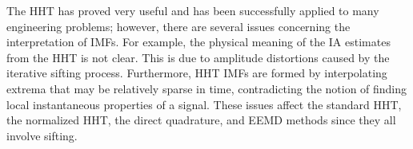 \documentclass[11pt,draftcls,onecolumn]{IEEEtran}
\begin{document}

The HHT has proved very useful and has been successfully applied to many engineering problems; however, there are several issues concerning the interpretation of IMFs. For example, the physical meaning of the IA estimates from the HHT is not clear. This is due to amplitude distortions caused by the iterative sifting process. Furthermore, HHT IMFs are formed by interpolating extrema that may be relatively sparse in time, contradicting the notion of finding local instantaneous properties of a signal. These issues affect the standard HHT, the normalized HHT, the direct quadrature, and EEMD methods since they all involve sifting. 

% 
\end{document}
